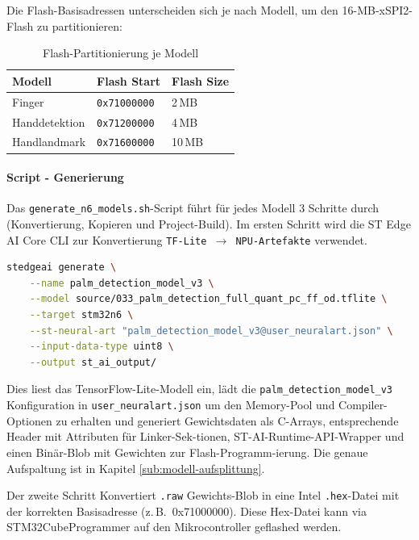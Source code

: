 Die Flash-Basisadressen unterscheiden sich je nach Modell, um den 16-MB-xSPI2-Flash zu partitionieren:

\begin{table}[htbp]
    \centering
    \begin{tabular}{|l|l|l|}
        \hline
        \textbf{Modell} & \textbf{Flash Start} & \textbf{Flash Size} \\
        \hline
        Finger & \texttt{0x71000000} & 2\,MB \\
        \hline
        Handdetektion & \texttt{0x71200000} & 4\,MB \\
        \hline
        Handlandmark & \texttt{0x71600000} & 10\,MB \\
        \hline
    \end{tabular}
    \caption{Flash-Partitionierung je Modell}
    \label{tab:flash-partitionierung}
\end{table}

\paragraph{Script - Generierung}
Das \texttt{generate\_n6\_models.sh}-Script führt für jedes Modell 3 Schritte durch (Konvertierung, Kopieren und Project-Build). Im ersten Schritt wird die ST Edge AI Core CLI zur Konvertierung \texttt{TF-Lite $\rightarrow$ NPU-Artefakte} verwendet.

\begin{lstlisting}[language=bash, caption={STedgeAI Modellgenerierung}, label={lst:stedgeai-generate}]
stedgeai generate \
    --name palm_detection_model_v3 \
    --model source/033_palm_detection_full_quant_pc_ff_od.tflite \
    --target stm32n6 \
    --st-neural-art "palm_detection_model_v3@user_neuralart.json" \
    --input-data-type uint8 \
    --output st_ai_output/
\end{lstlisting}

Dies liest das TensorFlow-Lite-Modell ein, lädt die \texttt{palm\_detection\_model\_v3} Konfiguration in \texttt{user\_neuralart.json} um den Memory-Pool und Compiler-Optionen zu erhalten und generiert Gewichtsdaten als C-Arrays, entsprechende Header mit Attributen für Linker-Sek-tionen, ST-AI-Runtime-API-Wrapper und einen Binär-Blob mit Gewichten zur Flash-Programm-ierung. Die genaue Aufspaltung ist in Kapitel \ref{sub:modell-aufsplittung}.

Der zweite Schritt Konvertiert \texttt{.raw} Gewichts-Blob in eine Intel \texttt{.hex}-Datei mit der korrekten Basisadresse (z.\,B.\ 0x71000000). Diese Hex-Datei kann via STM32CubeProgrammer auf den Mikrocontroller geflashed werden.

